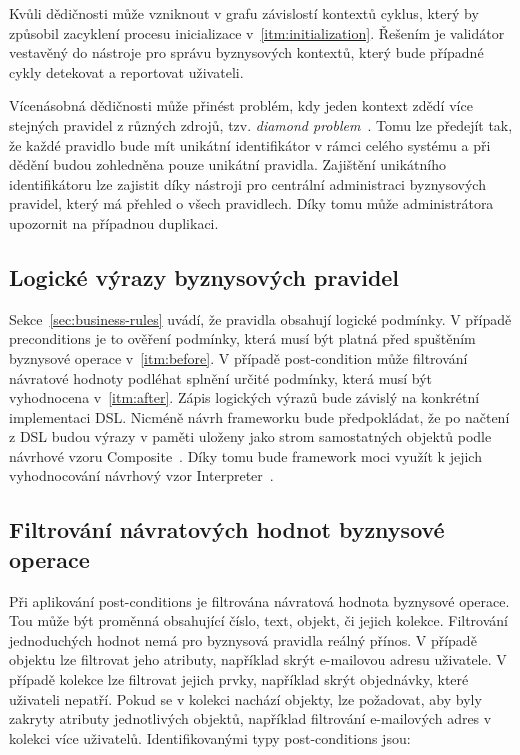 Kvůli dědičnosti může vzniknout v grafu závislostí kontextů cyklus, který by způsobil zacyklení
procesu inicializace v~\ref{itm:initialization}. Řešením je validátor vestavěný do nástroje pro
správu byznysových kontextů, který bude případné cykly detekovat a reportovat uživateli.

Vícenásobná dědičnosti může přinést problém, kdy jeden kontext zdědí více stejných pravidel z
různých zdrojů, tzv. \textit{diamond problem}~\cite{boyen1994generalized}. Tomu lze předejít tak, že
každé pravidlo bude mít unikátní identifikátor v rámci celého systému a při dědění budou zohledněna
pouze unikátní pravidla. Zajištění unikátního identifikátoru lze zajistit díky nástroji pro centrální
administraci byznysových pravidel, který má přehled o všech pravidlech. Díky tomu může administrátora
upozornit na případnou duplikaci.

\subsection{Logické výrazy byznysových pravidel}\label{sec:expressions-design}

Sekce~\ref{sec:business-rules} uvádí, že pravidla obsahují logické podmínky. V případě preconditions je to
ověření podmínky, která musí být platná před spuštěním byznysové operace v~\ref{itm:before}. V případě
post-condition může filtrování návratové hodnoty podléhat splnění určité podmínky, která musí být
vyhodnocena v~\ref{itm:after}. Zápis logických výrazů bude závislý na konkrétní implementaci \gls{DSL}.
Nicméně návrh frameworku bude předpokládat, že po načtení z \gls{DSL} budou výrazy v paměti uloženy
jako strom samostatných objektů podle návrhové vzoru Composite~\cite{fowler2002patterns}. Díky tomu
bude framework moci využít k jejich vyhodnocování návrhový vzor Interpreter~\cite{fowler2002patterns}.

\subsection{Filtrování návratových hodnot byznysové operace}

Při aplikování post-conditions je filtrována návratová hodnota byznysové operace. Tou může být proměnná
obsahující číslo, text, objekt, či jejich kolekce. Filtrování jednoduchých hodnot nemá pro byznysová pravidla reálný přínos.
V případě objektu lze filtrovat jeho atributy, například skrýt e-mailovou adresu uživatele.
V případě kolekce lze filtrovat jejich prvky, například skrýt objednávky, které uživateli nepatří.
Pokud se v kolekci nachází objekty, lze požadovat, aby byly zakryty atributy jednotlivých objektů,
například filtrování e-mailových adres v kolekci více uživatelů. Identifikovanými typy post-conditions jsou:

